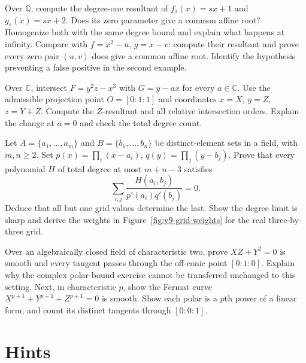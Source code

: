 \begin{exercise}[$\star\star$]\label{ex:v9-resultant-specialization}
Over $\mathbb Q$, compute the degree-one resultant of $f_s(x)=sx+1$ and $g_s(x)=sx+2$. Does its zero parameter give a common affine root? Homogenize both with the same degree bound and explain what happens at infinity. Compare with $f=x^2-u$, $g=x-v$: compute their resultant and prove every zero pair $(u,v)$ does give a common affine root. Identify the hypothesis preventing a false positive in the second example.
\end{exercise}
\begin{exercise}[$\star\star$]\label{ex:v9-cusp-orders}
Over $\mathbb C$, intersect $F=y^2z-x^3$ with $G=y-ax$ for every $a\in\mathbb C$. Use the admissible projection point $O=[0:1:1]$ and coordinates $x=X$, $y=Z$, $z=Y+Z$. Compute the $Z$-resultant and all relative intersection orders. Explain the change at $a=0$ and check the total degree count.
\end{exercise}
\begin{exercise}[$\star\star\star$]\label{ex:v9-grid-interpolation}
Let $A=\{a_1,\ldots,a_m\}$ and $B=\{b_1,\ldots,b_n\}$ be distinct-element sets in a field, with $m,n\ge2$. Set $p(x)=\prod_i(x-a_i)$, $q(y)=\prod_j(y-b_j)$. Prove that every polynomial $H$ of total degree at most $m+n-3$ satisfies
\[
\sum_{i,j}\frac{H(a_i,b_j)}{p'(a_i)q'(b_j)}=0.
\]
Deduce that all but one grid values determine the last. Show the degree limit is sharp and derive the weights in Figure~\ref{fig:v9-grid-weights} for the real three-by-three grid.
\end{exercise}
\begin{exercise}[$\star\star$]\label{ex:v9-positive-characteristic-tangents}
Over an algebraically closed field of characteristic two, prove $XZ+Y^2=0$ is smooth and every tangent passes through the off-conic point $[0:1:0]$. Explain why the complex polar-bound exercise cannot be transferred unchanged to this setting. Next, in characteristic $p$, show the Fermat curve $X^{p+1}+Y^{p+1}+Z^{p+1}=0$ is smooth. Show each polar is a $p$th power of a linear form, and count its distinct tangents through $[0:0:1]$.
\end{exercise}

\section{Hints}

